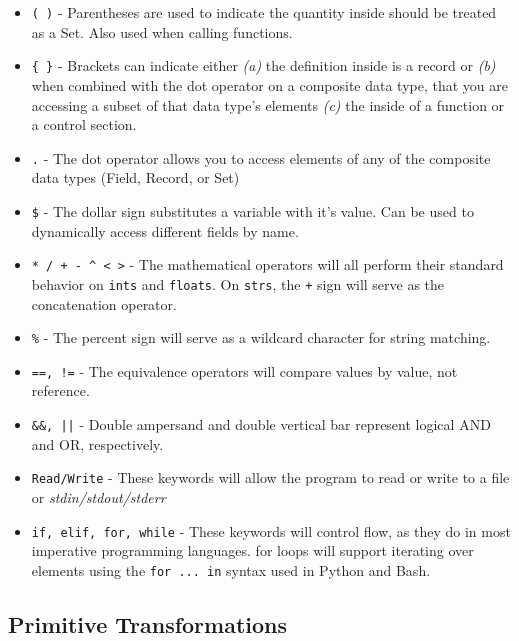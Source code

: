 \documentclass{article}
\begin{document}
\begin{itemize}

\item \texttt{( )} - Parentheses are used to indicate the quantity inside should be treated as a Set. Also used when calling functions.

\item \texttt{\{ \}} - Brackets can indicate either \emph{(a)} the definition inside is a record or \emph{(b)} when combined with the dot operator on a composite data type, that you are accessing a subset of that data type's elements \emph{(c)} the inside of a function or a control section.

\item \texttt{.} - The dot operator allows you to access elements of any of the composite data types (Field, Record, or Set)

\item \texttt{\$} - The dollar sign substitutes a variable with it's value. Can be used to dynamically access different fields by name.

\item \texttt{* / + - \^{}  < >} - The mathematical operators will all perform their standard behavior on \texttt{ints} and \texttt{floats}. On \texttt{strs}, the \texttt{+} sign will serve as the concatenation operator.

\item \texttt{\%} - The percent sign will serve as a wildcard character for string matching.

\item \texttt{==, !=}  - The equivalence operators will compare values by value, not reference.

\item \texttt{\&\&, ||} - Double ampersand and double vertical bar represent logical AND and OR, respectively.

\item \texttt{Read/Write} - These keywords will allow the program to read or write to a file or \emph{stdin/stdout/stderr} 

\item \texttt{if, elif, for, while} - These keywords will control flow, as they do in most imperative programming languages. for loops will support iterating over elements using the \texttt{for ... in} syntax used in Python and Bash.

\end{itemize}


\subsection{Primitive Transformations}
\end{document}
